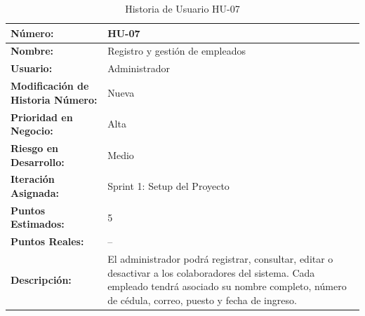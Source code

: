 \begin{table}[h]
	\centering
	\caption{Historia de Usuario HU-07}
	\begin{tabular}{|p{5cm}|p{9cm}|}
		\hline
		\textbf{Número:}                          & HU-07                                                                                                                                           \\ \hline
		\textbf{Nombre:}                          & Registro y gestión de empleados                                                                                                                 \\ \hline
		\textbf{Usuario:}                         & Administrador                                                                                                                                   \\ \hline
		\textbf{Modificación de Historia Número:} & Nueva                                                                                                                                           \\ \hline
		\textbf{Prioridad en Negocio:}            & Alta                                                                                                                                            \\ \hline
		\textbf{Riesgo en Desarrollo:}            & Medio                                                                                                                                           \\ \hline
		\textbf{Iteración Asignada:}              & Sprint 1: Setup del Proyecto                                                                                                                    \\ \hline
		\textbf{Puntos Estimados:}                & 5                                                                                                                                               \\ \hline
		\textbf{Puntos Reales:}                   & --                                                                                                                                              \\ \hline
		\textbf{Descripción:}                     &
		El administrador podrá registrar, consultar, editar o desactivar a los colaboradores del sistema. Cada empleado tendrá asociado su nombre completo, número de cédula, correo, puesto y fecha de ingreso.


\end{tabular}
\end{table}
